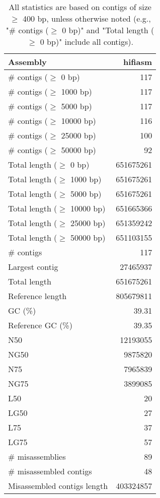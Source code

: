 \documentclass[12pt,a4paper]{article}
\begin{document}
\begin{table}[ht]
\begin{center}
\caption{All statistics are based on contigs of size $\geq$ 400 bp, unless otherwise noted (e.g., "\# contigs ($\geq$ 0 bp)" and "Total length ($\geq$ 0 bp)" include all contigs).}
\begin{tabular}{|l*{1}{|r}|}
\hline
Assembly & hifiasm \\ \hline
\# contigs ($\geq$ 0 bp) & 117 \\ \hline
\# contigs ($\geq$ 1000 bp) & 117 \\ \hline
\# contigs ($\geq$ 5000 bp) & 117 \\ \hline
\# contigs ($\geq$ 10000 bp) & 116 \\ \hline
\# contigs ($\geq$ 25000 bp) & 100 \\ \hline
\# contigs ($\geq$ 50000 bp) & 92 \\ \hline
Total length ($\geq$ 0 bp) & 651675261 \\ \hline
Total length ($\geq$ 1000 bp) & 651675261 \\ \hline
Total length ($\geq$ 5000 bp) & 651675261 \\ \hline
Total length ($\geq$ 10000 bp) & 651665366 \\ \hline
Total length ($\geq$ 25000 bp) & 651359242 \\ \hline
Total length ($\geq$ 50000 bp) & 651103155 \\ \hline
\# contigs & 117 \\ \hline
Largest contig & 27465937 \\ \hline
Total length & 651675261 \\ \hline
Reference length & 805679811 \\ \hline
GC (\%) & 39.31 \\ \hline
Reference GC (\%) & 39.35 \\ \hline
N50 & 12193055 \\ \hline
NG50 & 9875820 \\ \hline
N75 & 7965839 \\ \hline
NG75 & 3899085 \\ \hline
L50 & 20 \\ \hline
LG50 & 27 \\ \hline
L75 & 37 \\ \hline
LG75 & 57 \\ \hline
\# misassemblies & 89 \\ \hline
\# misassembled contigs & 48 \\ \hline
Misassembled contigs length & 403324857 \\ \hline

\end{tabular}
\end{center}
\end{table}
\end{document}
